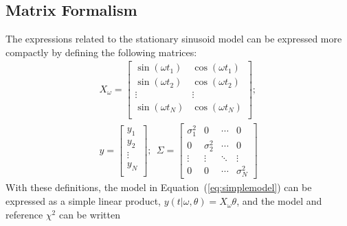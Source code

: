 \documentclass{emulateapj}
\newcommand{\Eq}[1]{Equation~(\ref{eq:#1})}
\newcommand{\eq}[1]{\Eq{#1}}
\newcommand{\sectlabel}[1]{\label{sect:#1}}
\begin{document}
\subsection{Matrix Formalism}
\sectlabel{matrix_formalism}
The expressions related to the stationary sinusoid model can be expressed more compactly by defining the following matrices:
\begin{eqnarray}
X_\omega = \left[
\begin{array}{cc}
\sin(\omega t_1) & \cos(\omega t_1)\\
\sin(\omega t_2) & \cos(\omega t_2)\\
\vdots & \vdots \\
\sin(\omega t_N) & \cos(\omega t_N)\\
\end{array}
\right]; \nonumber\\
y = \left[
\begin{array}{c}
y_1 \\
y_2\\
\vdots \\
y_N\\
\end{array}
\right];~~
\Sigma = \left[
\begin{array}{cccc}
\sigma_1^2 & 0 &  \cdots & 0\\
0 & \sigma_2^2 &  \cdots & 0\\
\vdots & \vdots &  \ddots & \vdots\\
0 & 0 &  \cdots & \sigma_N^2
\end{array}
\right]
\end{eqnarray}
With these definitions, the model in \eq{simplemodel} can be expressed as a simple linear product, $y(t|\omega,\theta) = X_\omega\theta$, and the model and reference $\chi^2$ can be written
\end{document}
